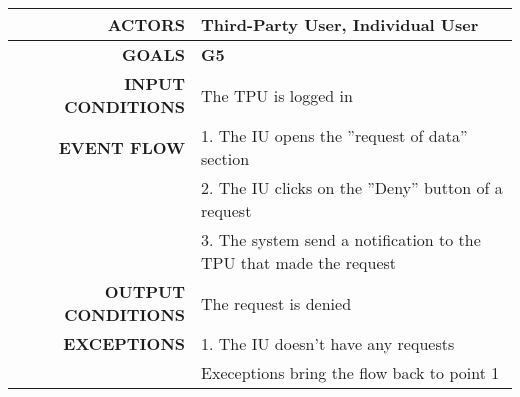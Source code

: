 \begin{table}[h!]
\begin{tabular}{|r|p{3in}|}
\hline
\textbf{ACTORS} & Third-Party User, Individual User\\
\hline
\textbf{GOALS} & \textbf{G5}\\
\hline
\textbf{INPUT CONDITIONS} & The TPU is logged in\\
\hline
\textbf{EVENT FLOW} 
&1. The IU opens the ''request of data'' section \\
&2. The IU clicks on the ''Deny'' button of a request \\
&3. The system send a notification to the TPU that made the request \\
\hline
\textbf{OUTPUT CONDITIONS} & The request is denied\\
\hline
\textbf{EXCEPTIONS} 
&1. The IU doesn't have any requests \\
&Execeptions bring the flow back to point 1 \\
\hline
\end{tabular}
\end{table}